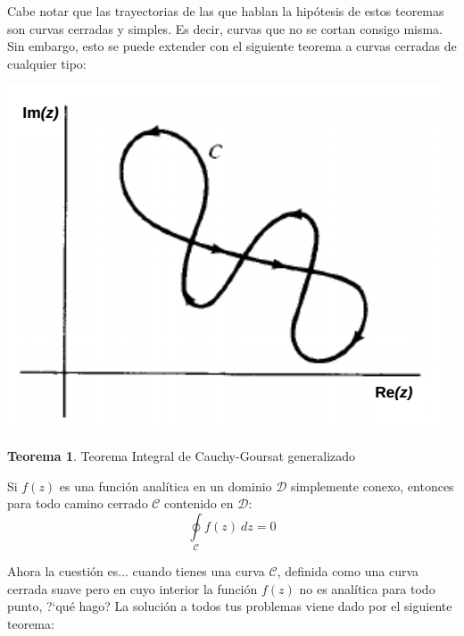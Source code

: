 \documentclass[12pt]{article}
\theoremstyle{definition}
\theoremstyle{theorem}
\newtheorem{theorem}{Teorema}[section]
\theoremstyle{corolary}
\begin{document}
\begin{multicols}{2}
Cabe notar que las trayectorias de las que hablan la hip\'otesis de estos teoremas son curvas cerradas y simples. Es decir, curvas que no se cortan consigo misma. Sin embargo, esto se puede extender con el siguiente teorema a curvas cerradas de cualquier tipo:

\begin{center}
	\includegraphics[scale=0.5]{curva_no_simple.png}
\end{center}

\end{multicols}

\colorbox{magenta!40!white!80}{\parbox{\linewidth}{
\theoremstyle{theorem}
\begin{theorem} {Teorema Integral de Cauchy-Goursat generalizado}

Si $f(z)$ es una funci\'on anal\'itica en un dominio $\mathcal{D}$ simplemente conexo, entonces para todo camino cerrado $\mathcal{C}$ contenido en $\mathcal{D}$: $$\oint\limits_{\mathcal{C}}f(z)\ dz = 0$$

\end{theorem}}}
\linebreak
\linebreak

Ahora la cuesti\'on es... cuando tienes una curva $\mathcal{C}$, definida como una curva cerrada suave pero en cuyo interior la funci\'on $f(z)$ no es anal\'itica para todo punto, ?`qu\'e hago? La soluci\'on a todos tus problemas viene dado por el siguiente teorema:\\
\end{document}
